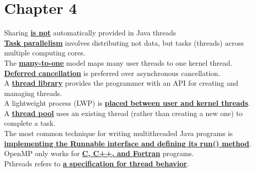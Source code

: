 \documentclass[10pt]{article}
\newcommand{\qw}[1]{\textbf{\ul{#1}}}
\begin{document}
\section*{\centering Chapter 4}
Sharing \qw{is not} automatically provided in Java threads\\[2mm]
\qw{Task parallelism} involves distributing not data, but tasks (threads) across multiple computing cores.\\[2mm]
The \qw{many-to-one} model maps many user threads to one kernel thread.\\[2mm]
\qw{Deferred cancellation} is preferred over asynchronous cancellation.\\[2mm]
A \qw{thread library} provides the programmer with an API for creating and managing threads.\\[2mm]
A lightweight process (LWP) is \qw{placed between user and kernel threads}.\\[2mm]
A \qw{thread pool} uses an existing thread (rather than creating a new one) to complete a task.\\[2mm]
The most common technique for writing multithreaded Java programs is \qw{implementing the Runnable interface and defining its run() method}.\\[2mm]
OpenMP only works for \qw{C, C++, and Fortran} programs.\\[2mm]
Pthreads refers to \qw{a specification for thread behavior}.
\newpage
\end{document}

